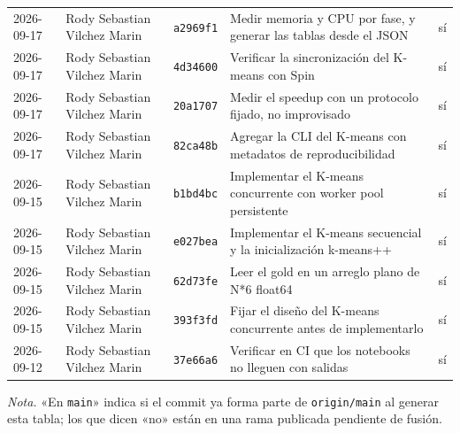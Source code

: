 {\begin{xltabular}{\textwidth}{@{}L{1.9cm}L{2.7cm}L{1.4cm}Yc@{}}
2026-09-17 & Rody Sebastian Vilchez Marin & \texttt{a2969f1} & Medir memoria y CPU por fase, y generar las tablas desde el JSON & sí \\
2026-09-17 & Rody Sebastian Vilchez Marin & \texttt{4d34600} & Verificar la sincronización del K-means con Spin & sí \\
2026-09-17 & Rody Sebastian Vilchez Marin & \texttt{20a1707} & Medir el speedup con un protocolo fijado, no improvisado & sí \\
2026-09-17 & Rody Sebastian Vilchez Marin & \texttt{82ca48b} & Agregar la CLI del K-means con metadatos de reproducibilidad & sí \\
2026-09-15 & Rody Sebastian Vilchez Marin & \texttt{b1bd4bc} & Implementar el K-means concurrente con worker pool persistente & sí \\
2026-09-15 & Rody Sebastian Vilchez Marin & \texttt{e027bea} & Implementar el K-means secuencial y la inicialización k-means++ & sí \\
2026-09-15 & Rody Sebastian Vilchez Marin & \texttt{62d73fe} & Leer el gold en un arreglo plano de N*6 float64 & sí \\
2026-09-15 & Rody Sebastian Vilchez Marin & \texttt{393f3fd} & Fijar el diseño del K-means concurrente antes de implementarlo & sí \\
2026-09-12 & Rody Sebastian Vilchez Marin & \texttt{37e66a6} & Verificar en CI que los notebooks no lleguen con salidas & sí \\
\end{xltabular}
}

{\footnotesize\textit{Nota.} «En \texttt{main}» indica si el commit ya forma parte de \texttt{origin/main} al generar esta tabla; los que dicen «no» están en una rama publicada pendiente de fusión.\par}
